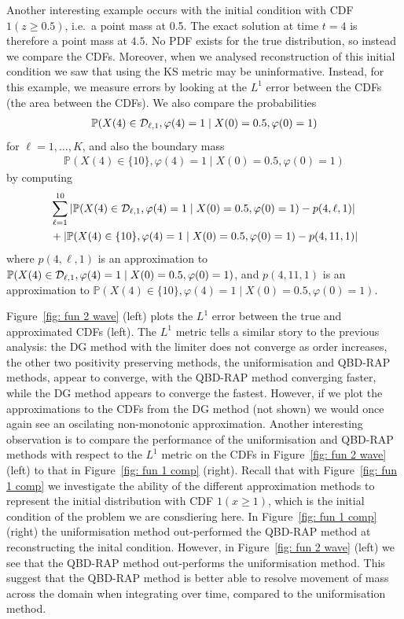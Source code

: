 \begin{example}Another interesting example occurs with the initial condition with CDF \(1(z\geq 0.5)\), i.e.~a point mass at 0.5. The exact solution at time \(t=4\) is therefore a point mass at \(4.5\). No PDF exists for the true distribution, so instead we compare the CDFs. Moreover, when we analysed reconstruction of this initial condition we saw that using the KS metric may be uninformative. Instead, for this example, we measure errors by looking at the \(L^1\) error between the CDFs (the area between the CDFs). We also compare the probabilities
\begin{align}
	\mathbb P(X(4)\in\mathcal{D}_{\ell,1}, \varphi(4)=1\mid X(0)=0.5,\varphi(0)=1) \label{eqn: cell probs}
\end{align}
for \(\ell=1,\dots,K\), and also the boundary mass
\begin{align}
	\mathbb P(X(4)\in\{10\}, \varphi(4)=1\mid X(0)=0.5,\varphi(0)=1) \label{eqn: cell probs boundary}
\end{align}
by computing 
\begin{align}
	&\sum_{\ell=1}^{10} \left|\mathbb P(X(4)\in\mathcal{D}_{\ell,1}, \varphi(4)=1\mid X(0)=0.5,\varphi(0)=1)-p(4,\ell,1)\right|\nonumber 
	\\&+\left|\mathbb P(X(4)\in\{10\}, \varphi(4)=1\mid X(0)=0.5,\varphi(0)=1)-p(4,11,1)\right| \label{eqn: cell errors}
\end{align}
where \(p(4,\ell,1)\) is an approximation to \(\mathbb P(X(4)\in\mathcal{D}_{\ell,1}, \varphi(4)=1\mid X(0)=0.5,\varphi(0)=1)\), and \(p(4,11,1)\) is an approximation to \(\mathbb P(X(4)\in\{10\}, \varphi(4)=1\mid X(0)=0.5,\varphi(0)=1)\).

Figure~\ref{fig: fun 2 wave} (left) plots the \(L^1\) error between the true and approximated CDFs (left). The \(L^1\) metric tells a similar story to the previous analysis: the DG method with the limiter does not converge as order increases, the other two positivity preserving methods, the uniformisation and QBD-RAP methods, appear to converge, with the QBD-RAP method converging faster, while the DG method appears to converge the fastest. However, if we plot the approximations to the CDFs from the DG method (not shown) we would once again see an oscilating non-monotonic approximation. Another interesting observation is to compare the performance of the uniformisation and QBD-RAP methods with respect to the \(L^1\) metric on the CDFs in Figure~\ref{fig: fun 2 wave} (left) to that in Figure~\ref{fig: fun 1 comp} (right). Recall that with Figure~\ref{fig: fun 1 comp} we investigate the ability of the different approximation methods to represent the initial distribution with CDF \(1(x\geq 1)\), which is the initial condition of the problem we are consdiering here. In Figure~\ref{fig: fun 1 comp} (right) the uniformisation method out-performed the QBD-RAP method at reconstructing the inital condition. However, in Figure~\ref{fig: fun 2 wave} (left) we see that the QBD-RAP method out-performs the uniformisation method. This suggest that the QBD-RAP method is better able to resolve movement of mass across the domain when integrating over time, compared to the uniformisation method.  


\end{example}
